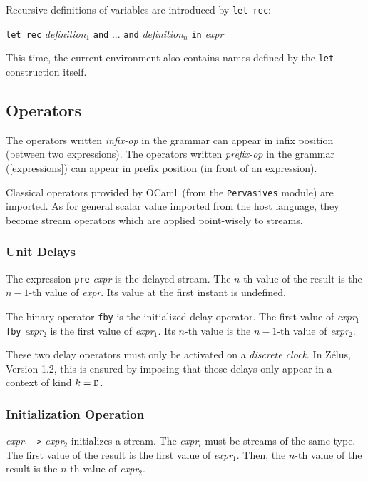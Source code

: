 \documentclass[11pt,titlepage,twoside]{report}
\newcommand{\zelus}{{\sf Z\'elus}}
\newcommand{\ocaml}{{\sf OCaml}}
\newcommand{\Let}{\mbox{{\tt let}}}
\newcommand{\Rec}{\mbox{{\tt rec}}}
\newcommand{\In}{\mbox{{\tt in}}}
\newcommand{\And}{\mbox{{\tt and}}}
\newcommand{\Pre}{\mbox{{\tt pre}}}
\newcommand{\Fby}{\mbox{{\tt fby}}}
\newcommand{\Minusgreater}{\mbox{{\tt ->}}}
\newcommand{\term}[1]{{\tt #1}}
\newcommand{\nterm}[1]{{\em #1}}
\begin{document}
Recursive definitions of variables are introduced by \term{\Let\ \Rec}:
\begin{center}
  \term{\Let\ \Rec} \nterm{definition}$_1$ \term{\And} ... 
  \term{\And} \nterm{definition}$_n$ \term{\In} \nterm{expr}
\end{center}

This time, the current environment also contains names defined by the \term{\Let}
construction itself.

\subsection{Operators}
The operators written \nterm{infix-op} in the grammar can appear in
infix position (between two expressions). The operators written
\nterm{prefix-op} in the grammar (\cref{expressions}) can appear
in prefix position (in front of an expression).

Classical operators provided by \ocaml\ (from the {\tt Pervasives}
module) are imported. As for general scalar value imported from the
host language, they become stream operators which are applied
point-wisely to streams.

\subsubsection{Unit Delays}
The expression \term{\Pre} \nterm{expr} is the delayed
stream. The $n$-th value of the result is the $n-1$-th
value of \nterm{expr}. Its value at the first instant is undefined.

The binary operator \term{\Fby} is the initialized delay operator. The
first value of \nterm{expr}$_1$ \term{\Fby} \nterm{expr}$_2$ is the
first value of \nterm{expr}$_1$. Its $n$-th value is the $n-1$-th
value of \nterm{expr}$_2$.

These two delay operators must only be activated on a \emph{discrete clock}. In
\zelus, Version 1.2, this is ensured by imposing that those delays only
appear in a context of kind $k = \mathtt{D}$.

\subsubsection{Initialization Operation}
\nterm{expr}$_1$ \term{\Minusgreater} \nterm{expr}$_2$ initializes a
stream. The \nterm{expr}$_i$ must be streams of the same type. The
first value of the result is the first value of
\nterm{expr}$_1$. Then, the $n$-th value of the result is the $n$-th
value of \nterm{expr}$_2$.
\end{document}

